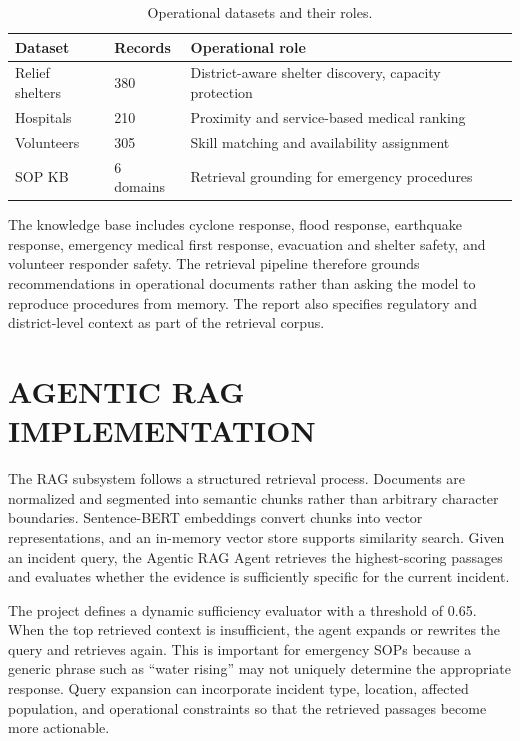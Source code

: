 \documentclass[conference]{IEEEtran}
\begin{document}
\begin{table}[htbp]
\caption{Operational datasets and their roles.}
\begin{center}
\begin{tabular}{|l|l|p{3.8cm}|}
\hline
\textbf{Dataset} & \textbf{Records} & \textbf{Operational role} \\
\hline
Relief shelters & 380 & District-aware shelter discovery, capacity protection \\
\hline
Hospitals & 210 & Proximity and service-based medical ranking \\
\hline
Volunteers & 305 & Skill matching and availability assignment \\
\hline
SOP KB & 6 domains & Retrieval grounding for emergency procedures \\
\hline
\end{tabular}
\end{center}
\end{table}

The knowledge base includes cyclone response, flood response, earthquake response, emergency medical first response, evacuation and shelter safety, and volunteer responder safety. The retrieval pipeline therefore grounds recommendations in operational documents rather than asking the model to reproduce procedures from memory. The report also specifies regulatory and district-level context as part of the retrieval corpus.

\section{AGENTIC RAG IMPLEMENTATION}
The RAG subsystem follows a structured retrieval process. Documents are normalized and segmented into semantic chunks rather than arbitrary character boundaries. Sentence-BERT embeddings convert chunks into vector representations, and an in-memory vector store supports similarity search. Given an incident query, the Agentic RAG Agent retrieves the highest-scoring passages and evaluates whether the evidence is sufficiently specific for the current incident.

The project defines a dynamic sufficiency evaluator with a threshold of 0.65. When the top retrieved context is insufficient, the agent expands or rewrites the query and retrieves again. This is important for emergency SOPs because a generic phrase such as ``water rising'' may not uniquely determine the appropriate response. Query expansion can incorporate incident type, location, affected population, and operational constraints so that the retrieved passages become more actionable.
\end{document}
